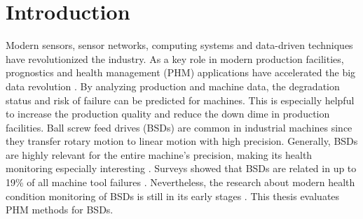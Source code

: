 
\chapter{Introduction}
Modern sensors, sensor networks, computing systems and data-driven techniques have revolutionized the industry. As a key role in modern production facilities, prognostics and health management (PHM) applications have accelerated the big data revolution \cite{ZHAO2019213}. By analyzing production and machine data, the degradation status and risk of failure can be predicted for machines. This is especially helpful to increase the production quality and reduce the down dime in production facilities. Ball screw feed drives (BSDs) are common in industrial machines since they transfer rotary motion to linear motion with high precision. Generally, BSDs are highly relevant for the entire machine’s precision, making its health monitoring especially interesting \cite{LiPin2018}. Surveys showed that BSDs are related in up to 19\% of all machine tool failures \cite{Denkena2021}. Nevertheless, the research about modern health condition monitoring of BSDs is still in its early stages \cite{LiPin2018}. This thesis evaluates PHM methods for BSDs.


